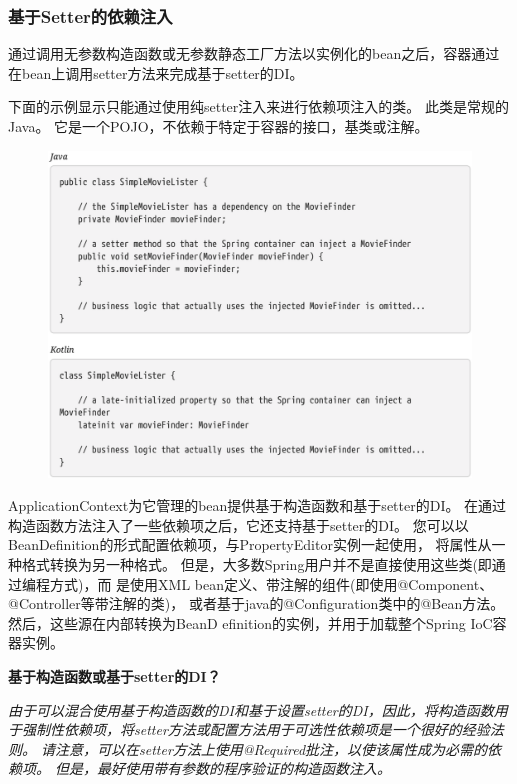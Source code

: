\newpage
\subsubsection{基于Setter的依赖注入}
通过调用无参数构造函数或无参数静态工厂方法以实例化的bean之后，容器通过在bean上调用setter方法来完成基于setter的DI。

下面的示例显示只能通过使用纯setter注入来进行依赖项注入的类。 此类是常规的Java。 它是一个POJO，不依赖于特定于容器的接口，基类或注解。

\begin{figure}[ht]
    \centering
    \includegraphics[width=1\linewidth]{./Figure/IMG_code_31.png}
\end{figure}

ApplicationContext为它管理的bean提供基于构造函数和基于setter的DI。
在通过构造函数方法注入了一些依赖项之后，它还支持基于setter的DI。
您可以以BeanDefinition的形式配置依赖项，与PropertyEditor实例一起使用，
将属性从一种格式转换为另一种格式。
但是，大多数Spring用户并不是直接使用这些类(即通过编程方式)，而
是使用XML bean定义、带注解的组件(即使用@Component、@Controller等带注解的类)，
或者基于java的@Configuration类中的@Bean方法。然后，这些源在内部转换为BeanD
efinition的实例，并用于加载整个Spring IoC容器实例。


\begin{center}
    \textbf{基于构造函数或基于setter的DI？}
\end{center}

\textit{由于可以混合使用基于构造函数的DI和基于设置setter的DI，因此，将构造函数用于强制性依赖项，将setter方法或配置方法用于可选性依赖项是一个很好的经验法则。 请注意，可以在setter方法上使用@Required批注，以使该属性成为必需的依赖项。 但是，最好使用带有参数的程序验证的构造函数注入。}

